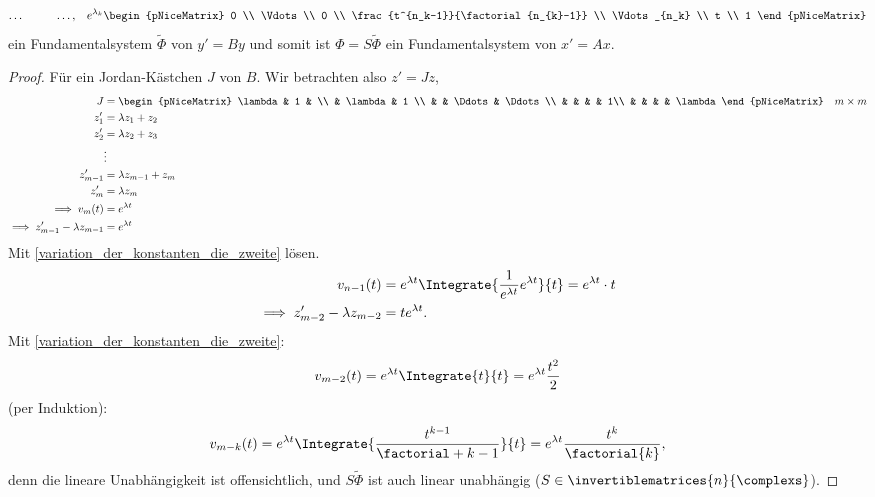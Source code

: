 \begin{satz}
\begin{align*}
    \dotsc && && && \dotsc, &&e^{\lambda_k}\begin{pNiceMatrix} 0 \\ \Vdots \\ 0 \\ \frac{t^{n_k-1}}{\factorial{n_{k}-1}} \\ \Vdots_{n_k} \\ t \\ 1 \end{pNiceMatrix}
  \end{align*}
  ein Fundamentalsystem \( \tilde{\Phi} \) von \( y'=By \) und somit ist \( \Phi=S\tilde{\Phi} \) ein Fundamentalsystem von \( x'=Ax \).
\end{satz}
\begin{proof}
  Für ein Jordan-Kästchen \( J \) von \( B \). Wir betrachten also \( z'=Jz \),
  \begin{align*}
    J&=\begin{pNiceMatrix}
      \lambda & 1 &  \\
       & \lambda & 1 \\
       &  & \Ddots & \Ddots \\
       & & & & 1\\
       & & & & \lambda
    \end{pNiceMatrix}\quad m\times m\\
    z_1'&=\lambda z_1+z_2\\
    z_2'&=\lambda z_2+z_3\\
    &\vdots \\
    z_{m-1}'&=\lambda z_{m-1}+z_m\\
    z_m'&=\lambda z_m\\
    \implies v_m(t)&=e^{\lambda t}\\
    \implies z_{m-1}'-\lambda z_{m-1}&=e^{\lambda t} 
  \end{align*}
  Mit \ref{variation_der_konstanten_die_zweite} lösen.
  \begin{align*}
    v_{n-1}(t)&=e^{\lambda t}\Integrate{\frac{1}{e^{\lambda t}} e^{\lambda t}}{t}=e^{\lambda t}\cdot t\\
    \implies z_{m-2}'-\lambda z_{m-2}&= te^{\lambda t}.
  \end{align*}
  Mit \ref{variation_der_konstanten_die_zweite}:
  \begin{equation*}
    v_{m-2}(t)=e^{\lambda t}\Integrate{t}{t}=e^{\lambda t}\frac{t^2}{2}
  \end{equation*}
  \timplies \Beh (per Induktion):
  \begin{equation*}
    v_{m-k}(t)=e^{\lambda t}\Integrate{\frac{t^{k-1}}{\factorial+{k-1}}}{t}=e^{\lambda t}\frac{t^k}{\factorial{k}},
  \end{equation*}
  denn die lineare Unabhängigkeit ist offensichtlich, und \( S\tilde{\Phi} \) ist auch linear unabhängig (\( S\in \invertiblematrices{n}{\complexs} \)).
  
\end{proof}
